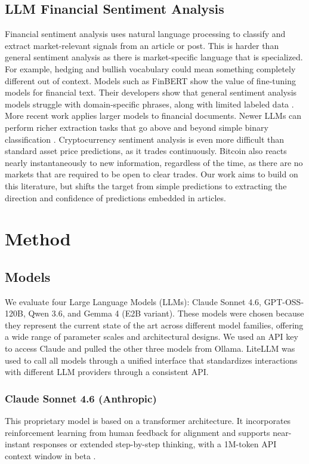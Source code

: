 \documentclass[sigconf,screen]{acmart}
\begin{document}
\subsection{LLM Financial Sentiment Analysis}
Financial sentiment analysis uses natural language processing to classify and extract market-relevant signals from an article or post. This is harder than general sentiment analysis as there is market-specific language that is specialized. For example, hedging and bullish vocabulary could mean something completely different out of context. Models such as FinBERT show the value of fine-tuning models for financial text. Their developers show that general sentiment analysis models struggle with domain-specific phrases, along with limited labeled data \cite{araci2019finbert}. More recent work applies larger models to financial documents. Newer LLMs can perform richer extraction tasks that go above and beyond simple binary classification \cite{shen2024financial}. Cryptocurrency sentiment analysis is even more difficult than standard asset price predictions, as it trades continuously. Bitcoin also reacts nearly instantaneously to new information, regardless of the time, as there are no markets that are required to be open to clear trades. Our work aims to build on this literature, but shifts the target from simple predictions to extracting the direction and confidence of predictions embedded in articles.

\section{Method}

\subsection{Models}
We evaluate four Large Language Models (LLMs): Claude Sonnet 4.6,
GPT-OSS-120B, Qwen 3.6, and Gemma 4 (E2B variant). These models were
chosen because they represent the current state of the art across different
model families, offering a wide range of parameter scales and architectural
designs. We used an API key to access Claude and pulled the other three
models from Ollama. LiteLLM was used to call all models through a unified
interface that standardizes interactions with different LLM providers through
a consistent API.

\subsubsection{Claude Sonnet 4.6 (Anthropic)}
This proprietary model is based on a transformer architecture. It incorporates
reinforcement learning from human feedback for alignment and supports
near-instant responses or extended step-by-step thinking, with a 1M-token API
context window in beta \cite{anthropic2026claudesonnet46}.
\end{document}
